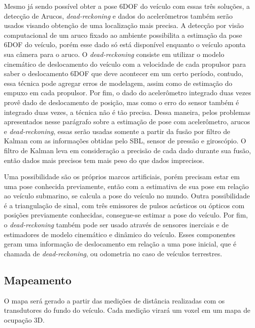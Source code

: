 Mesmo já sendo possível obter a pose 6DOF do veículo com essas três soluções, a detecção de Arucos, \textit{dead-reckoning} e dados do acelerômetros também serão usados visando obtenção de uma localização mais precisa. A detecção por visão computacional de um aruco fixado ao ambiente possibilita a estimação da pose 6DOF do veículo, porém esse dado só está disponível enquanto o veículo aponta sua câmera para o aruco. O \textit{dead-reckoning} consiste em utilizar o modelo cinemático de deslocamento do veículo com a velocidade de cada propulsor para saber o deslocamento 6DOF que deve acontecer em um certo período, contudo, essa técnica pode agregar erros de modelagem, assim como de estimação do empuxo em cada propulsor. Por fim, o dado do acelerômetro integrado duas vezes provê dado de deslocamento de posição, mas como o erro do sensor também é integrado duas vezes, a técnica não é tão precisa. Dessa maneira, pelos problemas apresentados nesse parágrafo sobre a estimação de pose com acelerômetro, arucos e \textit{dead-reckoning}, essas serão usadas somente a partir da fusão por filtro de Kalman com as informações obtidas pelo SBL, sensor de pressão e giroscópio. O filtro de Kalman leva em consideração a precisão de cada dado durante sua fusão, então dados mais precisos tem mais peso do que dados imprecisos. 

Uma possibilidade são os próprios marcos artificiais, porém precisam estar em uma pose conhecida previamente, então com a estimativa de sua pose em relação ao veículo submarino, se calcula a pose do veículo no mundo. Outra possibilidade é a triangulação de sinal, com três emissores de pulsos acústicos ou ópticos com posições previamente conhecidas, consegue-se estimar a pose do veículo. Por fim, o \textit{dead-reckoning} também pode ser usado através de sensores inerciais e de estimadores de modelo cinemático e dinâmico do veículo. Esses componentes geram uma informação de deslocamento em relação a uma pose inicial, que é chamada de \textit{dead-reckoning}, ou odometria no caso de veículos terrestres.

\subsection{Mapeamento}
\label{subsec:mapeamento}

O mapa será gerado a partir das medições de distância realizadas com os transdutores do fundo do veículo. Cada medição virará um voxel em um mapa de ocupação 3D.